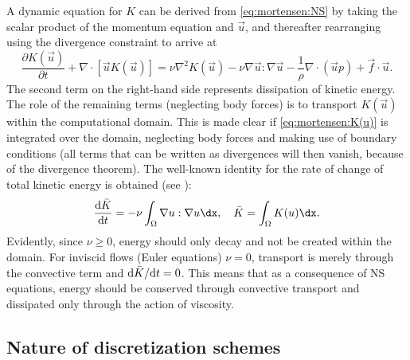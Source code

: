 A dynamic equation for $K$ can be derived from \eqref{eq:mortensen:NS}
by taking the scalar product of the momentum equation and $\vec{u}$,
and thereafter rearranging using the divergence constraint to arrive at
\begin{equation}
 \frac{\partial K(\vec{u})}{\partial t} + \nabla \cdot [\vec{u}K(\vec{u})]
        = \nu \nabla^2 K(\vec{u}) -\nu \nabla \vec{u} : \nabla \vec{u}
      - \frac{1}{\rho}\nabla \cdot \left(\vec{u}p \right) +\vec{f}\cdot \vec{u}.
 \label{eq:mortensen:K(u)}
\end{equation}
The second term on the right-hand side represents dissipation of kinetic
energy. The role of the remaining terms (neglecting body forces) is
to transport $K(\vec{u})$ within the computational domain. This is
made clear if \eqref{eq:mortensen:K(u)} is integrated over the domain,
neglecting body forces and making use of boundary conditions (all terms
that can be written as divergences will then vanish, because of the
divergence theorem). The well-known identity for the rate of change of
total kinetic energy is obtained (see \citet{SimoArmero1994}):
\begin{equation}
 \frac{\text{d} \Bar{K} }{\text{d} t} = - \nu \int_\Omega \nabla
 \vec{u} : \nabla \vec{u} \dx,
\quad \Bar{K} = \int_{\Omega} K(\vec{u}) \dx .
\end{equation}
Evidently, since $\nu \ge 0$, energy should only decay and not be created
within the domain. For
inviscid flows (Euler equations) $\nu=0$, transport is merely through
the convective term and $\text{d} \Bar{K}/\text{d} t = 0$. This means
that as a consequence of NS equations, energy should be conserved through
convective transport and dissipated only through the action of viscosity.


\subsection{Nature of discretization schemes}
\label{sec:mortensen:dissipative:dispersive}


